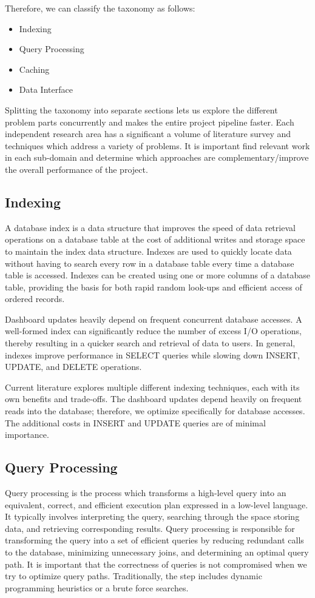 Therefore, we can classify the taxonomy as follows:
\begin{itemize}
    \item Indexing
    \item Query Processing
    \item Caching
    \item Data Interface
\end{itemize}

Splitting the taxonomy into separate sections lets us explore the different problem parts concurrently and makes the entire project pipeline faster. Each independent research area has a significant a volume of literature survey and techniques which address a variety of problems. It is important find relevant work in each sub-domain and determine which approaches are complementary/improve the overall performance of the project.

\subsection{Indexing}
A database index is a data structure that improves the speed of data retrieval operations on a database table at the cost of additional writes and storage space to maintain the index data structure. Indexes are used to quickly locate data without having to search every row in a database table every time a database table is accessed. Indexes can be created using one or more columns of a database table, providing the basis for both rapid random look-ups and efficient access of ordered records\cite{Indexing}. 

Dashboard updates heavily depend on frequent concurrent database accesses. A well-formed index can significantly reduce the number of excess I/O operations, thereby resulting in a quicker search and retrieval of data to users. In general, indexes improve performance in SELECT queries while slowing down INSERT, UPDATE, and DELETE operations.\cite{IndexingFundamentals}

Current literature explores multiple different indexing techniques, each with its own benefits and trade-offs. The dashboard updates depend heavily on frequent reads into the database; therefore, we optimize specifically for database accesses. The additional costs in INSERT and UPDATE queries are of minimal importance.

\subsection{Query Processing}
Query processing is the process which transforms a high-level query into an equivalent, correct, and efficient execution plan expressed in a low-level language. It typically involves interpreting the query, searching through the space storing data, and retrieving corresponding results. Query processing is responsible for transforming the query into a set of efficient queries by reducing redundant calls to the database, minimizing unnecessary joins, and determining an optimal query path.\cite{QueryProcessing} It is important that the correctness of queries is not compromised when we try to optimize query paths. Traditionally, the step includes dynamic programming heuristics or a brute force searches.

